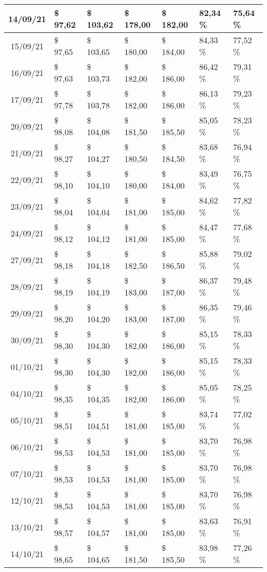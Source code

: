 \begin{center}
\begin{longtable}{|c|p{1.5cm}|p{1.5cm}|p{1.5cm}|p{1.5cm}|p{1.5cm}|p{1.5cm}|}
14/09/21 & \$ 97,62 & \$ 103,62 & \$ 178,00 & \$ 182,00 & 82,34 \% & 75,64 \% \\ \hline
15/09/21 & \$ 97,65 & \$ 103,65 & \$ 180,00 & \$ 184,00 & 84,33 \% & 77,52 \% \\ \hline
16/09/21 & \$ 97,63 & \$ 103,73 & \$ 182,00 & \$ 186,00 & 86,42 \% & 79,31 \% \\ \hline
17/09/21 & \$ 97,78 & \$ 103,78 & \$ 182,00 & \$ 186,00 & 86,13 \% & 79,23 \% \\ \hline
20/09/21 & \$ 98,08 & \$ 104,08 & \$ 181,50 & \$ 185,50 & 85,05 \% & 78,23 \% \\ \hline
21/09/21 & \$ 98,27 & \$ 104,27 & \$ 180,50 & \$ 184,50 & 83,68 \% & 76,94 \% \\ \hline
22/09/21 & \$ 98,10 & \$ 104,10 & \$ 180,00 & \$ 184,00 & 83,49 \% & 76,75 \% \\ \hline
23/09/21 & \$ 98,04 & \$ 104,04 & \$ 181,00 & \$ 185,00 & 84,62 \% & 77,82 \% \\ \hline
24/09/21 & \$ 98,12 & \$ 104,12 & \$ 181,00 & \$ 185,00 & 84,47 \% & 77,68 \% \\ \hline
27/09/21 & \$ 98,18 & \$ 104,18 & \$ 182,50 & \$ 186,50 & 85,88 \% & 79,02 \% \\ \hline
28/09/21 & \$ 98,19 & \$ 104,19 & \$ 183,00 & \$ 187,00 & 86,37 \% & 79,48 \% \\ \hline
29/09/21 & \$ 98,20 & \$ 104,20 & \$ 183,00 & \$ 187,00 & 86,35 \% & 79,46 \% \\ \hline
30/09/21 & \$ 98,30 & \$ 104,30 & \$ 182,00 & \$ 186,00 & 85,15 \% & 78,33 \% \\ \hline
01/10/21 & \$ 98,30 & \$ 104,30 & \$ 182,00 & \$ 186,00 & 85,15 \% & 78,33 \% \\ \hline
04/10/21 & \$ 98,35 & \$ 104,35 & \$ 182,00 & \$ 186,00 & 85,05 \% & 78,25 \% \\ \hline
05/10/21 & \$ 98,51 & \$ 104,51 & \$ 181,00 & \$ 185,00 & 83,74 \% & 77,02 \% \\ \hline
06/10/21 & \$ 98,53 & \$ 104,53 & \$ 181,00 & \$ 185,00 & 83,70 \% & 76,98 \% \\ \hline
07/10/21 & \$ 98,53 & \$ 104,53 & \$ 181,00 & \$ 185,00 & 83,70 \% & 76,98 \% \\ \hline
12/10/21 & \$ 98,53 & \$ 104,53 & \$ 181,00 & \$ 185,00 & 83,70 \% & 76,98 \% \\ \hline
13/10/21 & \$ 98,57 & \$ 104,57 & \$ 181,00 & \$ 185,00 & 83,63 \% & 76,91 \% \\ \hline
14/10/21 & \$ 98,65 & \$ 104,65 & \$ 181,50 & \$ 185,50 & 83,98 \% & 77,26 \% \\ \hline

\end{longtable}
\end{center}

